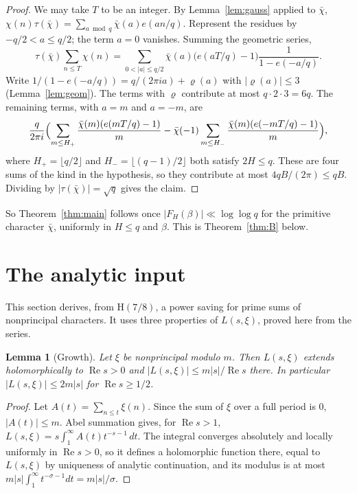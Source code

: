 \documentclass[11pt]{amsart}
\newtheorem{lemma}[theorem]{Lemma}
\theoremstyle{definition}
\theoremstyle{remark}
\numberwithin{equation}{section}
\newcommand{\R}{\operatorname{Re}}
\newcommand{\e}{e}
\begin{document}
\begin{proof}
We may take $T$ to be an integer. By Lemma~\ref{lem:gauss} applied to $\bar\chi$,
$\chi(n)\tau(\bar\chi)=\sum_{a\bmod q}\bar\chi(a)\e(an/q)$. Represent the
residues by $-q/2<a\le q/2$; the term $a=0$ vanishes. Summing the geometric
series,
\[
\tau(\bar\chi)\sum_{n\le T}\chi(n)=\sum_{0<|a|\le q/2}\bar\chi(a)\bigl(\e(aT/q)-1\bigr)\frac1{1-\e(-a/q)} .
\]
Write $1/(1-\e(-a/q))=q/(2\pi ia)+\varrho(a)$ with $|\varrho(a)|\le3$
(Lemma~\ref{lem:geom}). The terms with $\varrho$ contribute at most $q\cdot2\cdot3=6q$.
The remaining terms, with $a=m$ and $a=-m$, are
\[
\frac q{2\pi i}\Bigl(\sum_{m\le H_+}\frac{\bar\chi(m)(\e(mT/q)-1)}m-\bar\chi(-1)\sum_{m\le H_-}\frac{\bar\chi(m)(\e(-mT/q)-1)}m\Bigr),
\]
where $H_+=\lfloor q/2\rfloor$ and $H_-=\lfloor(q-1)/2\rfloor$ both satisfy $2H\le
q$. These are four sums of the kind in the hypothesis, so they contribute at
most $4qB/(2\pi)\le qB$. Dividing by $|\tau(\bar\chi)|=\sqrt q$ gives the claim.
\end{proof}

So Theorem~\ref{thm:main} follows once $|F_H(\beta)|\ll\log\log q$ for the
primitive character $\bar\chi$, uniformly in $H\le q$ and $\beta$. This is
Theorem~\ref{thm:B} below.

\section{The analytic input}\label{sec:analytic}

This section derives, from $\mathrm H(7/8)$, a power saving for prime sums of
nonprincipal characters. It uses three properties of $L(s,\xi)$, proved here
from the series.

\begin{lemma}[Growth]\label{lem:growth}
Let $\xi$ be nonprincipal modulo $m$. Then $L(s,\xi)$ extends holomorphically
to $\R s>0$ and $|L(s,\xi)|\le m|s|/\R s$ there. In particular
$|L(s,\xi)|\le2m|s|$ for $\R s\ge1/2$.
\end{lemma}

\begin{proof}
Let $A(t)=\sum_{n\le t}\xi(n)$. Since the sum of $\xi$ over a full period is
$0$, $|A(t)|\le m$. Abel summation gives, for $\R s>1$,
$L(s,\xi)=s\int_1^\infty A(t)t^{-s-1}\,dt$. The integral converges absolutely
and locally uniformly in $\R s>0$, so it defines a holomorphic function there,
equal to $L(s,\xi)$ by uniqueness of analytic continuation, and its modulus is
at most $m|s|\int_1^\infty t^{-\sigma-1}dt=m|s|/\sigma$.
\end{proof}
\end{document}
